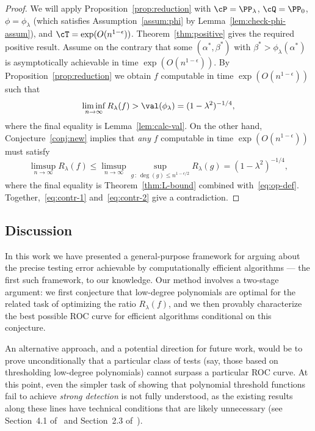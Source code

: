 \documentclass[11pt]{article}
\begin{document}
\begin{proof}
We will apply Proposition~\ref{prop:reduction} with $\cP = \PP_\lambda$, $\cQ = \PP_0$, $\phi = \phi_\lambda$ (which satisfies Assumption~\ref{assum:phi} by Lemma~\ref{lem:check-phi-assum}), and $\cT = \exp(O(n^{1-\epsilon}))$. Theorem~\ref{thm:positive} gives the required positive result. Assume on the contrary that some $(\alpha^*,\beta^*)$ with $\beta^* > \phi_\lambda(\alpha^*)$ is asymptotically achievable in time $\exp(O(n^{1-\epsilon}))$. By Proposition~\ref{prop:reduction} we obtain $f$ computable in time $\exp(O(n^{1-\epsilon}))$ such that
\begin{equation}\label{eq:contr-1}
\liminf_{n \to \infty} R_\lambda(f) > \val(\phi_\lambda) = (1-\lambda^2)^{-1/4},
\end{equation}
where the final equality is Lemma~\ref{lem:calc-val}. On the other hand, Conjecture~\ref{conj:new} implies that \emph{any} $f$ computable in time $\exp(O(n^{1-\epsilon}))$ must satisfy
\begin{equation}\label{eq:contr-2}
\limsup_{n \to \infty} R_\lambda(f) \le \limsup_{n \to \infty} \sup_{g \,:\, \deg(g) \le n^{1-\epsilon/2}} R_\lambda(g) = (1-\lambda^2)^{-1/4},
\end{equation}
where the final equality is Theorem~\ref{thm:L-bound} combined with~\eqref{eq:op-def}. Together,~\eqref{eq:contr-1} and~\eqref{eq:contr-2} give a contradiction.
\end{proof}





\subsection{Discussion}

In this work we have presented a general-purpose framework for arguing about the precise testing error achievable by computationally efficient algorithms --- the first such framework, to our knowledge. Our method involves a two-stage argument: we first conjecture that low-degree polynomials are optimal for the related task of optimizing the ratio $R_\lambda(f)$, and we then provably characterize the best possible ROC curve for efficient algorithms conditional on this conjecture.

An alternative approach, and a potential direction for future work, would be to prove unconditionally that a particular class of tests (say, those based on thresholding low-degree polynomials) cannot surpass a particular ROC curve. At this point, even the simpler task of showing that polynomial threshold functions fail to achieve \emph{strong detection} is not fully understood, as the existing results along these lines have technical conditions that are likely unnecessary (see Section~4.1 of~\cite{ld-notes} and Section~2.3 of~\cite{sparse-clustering}).
\end{document}
